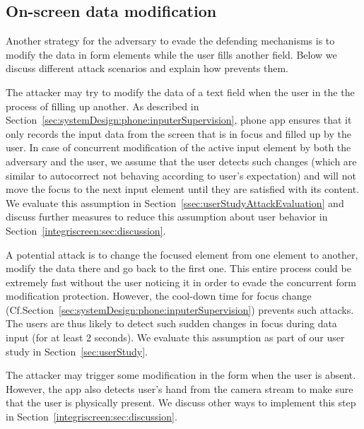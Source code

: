 \subsection{On-screen data modification}
Another strategy for the adversary to evade the defending mechanisms is to modify the data in form elements while the user fills another field. Below we discuss different attack scenarios and explain how \sysname prevents them.


 The attacker may try to modify the data of a text field when the user in the the process of filling up another. As described in Section~\ref{sec:systemDesign:phone:inputerSupervision}, \sysname phone app ensures that it only records the input data from the screen that is in focus and filled up by the user. In case of concurrent modification of the active input element by both the adversary and the user, we assume that the user detects such changes (which are similar to autocorrect not behaving according to user's expectation) and will not move the focus to the next input element until they are satisfied with its content.
We evaluate this assumption in Section~\ref{ssec:userStudyAttackEvaluation} and discuss further measures to reduce this assumption about user behavior in Section~\ref{integriscreen:sec:discussion}.


 A potential attack is to change the focused element from one element to another, modify the data there and go back to the first one. This entire process could be extremely fast without the user noticing it in order to evade the concurrent form modification protection. However, the cool-down time for focus change (Cf.Section~\ref{sec:systemDesign:phone:inputerSupervision}) prevents such attacks. The users are thus likely to detect such sudden changes in focus during data input (for at least 2 seconds). We evaluate this assumption as part of our user study in Section~\ref{sec:userStudy}.

 The attacker may trigger some modification in the form when the user is absent. However, the \sysname app also detects user's hand from the camera stream to make sure that the user is physically present. We discuss other ways to implement this step in Section~\ref{integriscreen:sec:discussion}.